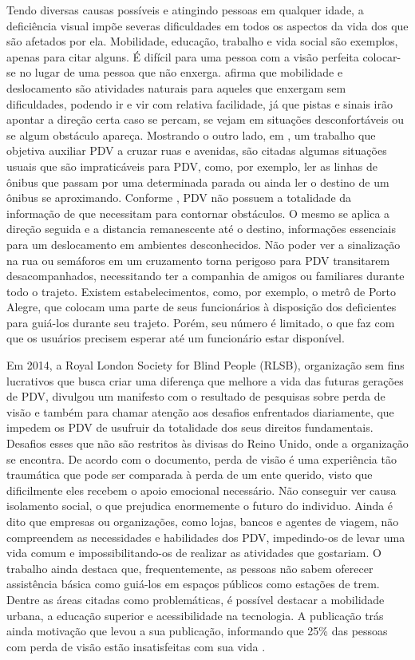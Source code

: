 \documentclass[english,brazilian]{UNISINOSmonografia}
\begin{document}
Tendo diversas causas possíveis e atingindo pessoas em qualquer idade, a deficiência visual impõe severas dificuldades em todos os aspectos da vida dos que são afetados por ela. Mobilidade, educação, trabalho e vida social são exemplos, apenas para citar alguns. É difícil para uma pessoa com a visão perfeita colocar-se no lugar de uma pessoa que não enxerga.  afirma que mobilidade e deslocamento são atividades naturais para aqueles que enxergam sem dificuldades, podendo ir e vir com relativa facilidade, já que pistas e sinais irão apontar a direção certa caso se percam, se vejam em situações desconfortáveis ou se algum obstáculo apareça. Mostrando o outro lado, em , um trabalho que objetiva auxiliar PDV a cruzar ruas e avenidas, são citadas algumas situações usuais que são impraticáveis para PDV, como, por exemplo, ler as linhas de ônibus que passam por uma determinada parada ou ainda ler o destino de um ônibus se aproximando. Conforme , PDV não possuem a totalidade da informação de que necessitam para contornar obstáculos. O mesmo se aplica a direção seguida e a distancia remanescente até o destino, informações essenciais para um deslocamento em ambientes desconhecidos. Não poder ver a sinalização na rua ou semáforos em um cruzamento torna perigoso para PDV transitarem desacompanhados, necessitando ter a companhia de amigos ou familiares durante todo o trajeto. Existem estabelecimentos, como, por exemplo, o metrô de Porto Alegre, que colocam uma parte de seus funcionários à disposição dos deficientes para guiá-los durante seu trajeto. Porém, seu número é limitado, o que faz com que os usuários precisem esperar até um funcionário estar disponível.

Em 2014, a Royal London Society for Blind People (RLSB), organização sem fins lucrativos que busca criar uma diferença que melhore a vida das futuras gerações de PDV, divulgou um manifesto com o resultado de pesquisas sobre perda de visão e também para chamar atenção aos desafios enfrentados diariamente, que impedem os PDV de usufruir da totalidade dos seus direitos fundamentais. Desafios esses que não são restritos às divisas do Reino Unido, onde a organização se encontra.
De acordo com o documento, perda de visão é uma experiência tão traumática que pode ser comparada à perda de um ente querido, visto que dificilmente eles recebem o apoio emocional necessário. Não conseguir ver causa isolamento social, o que prejudica enormemente o futuro do individuo. Ainda é dito que empresas ou organizações, como lojas, bancos e agentes de viagem, não compreendem as necessidades e habilidades dos PDV, impedindo-os de levar uma vida comum e impossibilitando-os de realizar as atividades que gostariam. O trabalho ainda destaca que, frequentemente, as pessoas não sabem oferecer assistência básica como guiá-los em espaços públicos como estações de trem. Dentre as áreas citadas como problemáticas, é possível destacar a mobilidade urbana, a educação superior e acessibilidade na tecnologia. A publicação trás ainda motivação que levou a sua publicação, informando que 25\% das pessoas com perda de visão estão insatisfeitas com sua vida \cite{YouthManifesto}.
\end{document}
